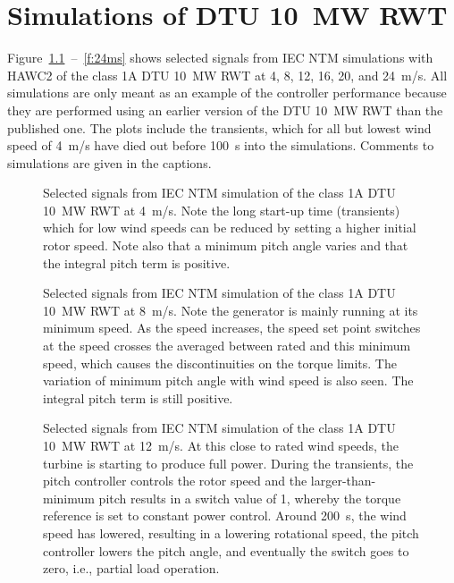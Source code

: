 \chapter{Simulations of DTU 10~MW RWT}

Figure~\ref{f:4ms}~--~\ref{f:24ms} shows selected signals from IEC NTM simulations with HAWC2 of the class 1A DTU 10~MW RWT at 4, 8, 12, 16, 20, and 24~m/s. All simulations are only meant as an example of the controller performance because they are performed using an earlier version of the DTU 10~MW RWT than the published one. The plots include the transients, which for all but lowest wind speed of 4~m/s have died out before 100~s into the simulations. Comments to simulations are given in the captions.


\begin{figure}[t]
\centerline{ }
\caption{Selected signals from IEC NTM simulation of the class 1A DTU 10~MW RWT at 4~m/s. Note the long start-up time (transients) which for low wind speeds can be reduced by setting a higher initial rotor speed. Note also that a minimum pitch angle varies and that the integral pitch term is positive. \label{f:4ms}}
\end{figure}


\begin{figure}[t]
\centerline{ }
\caption{Selected signals from IEC NTM simulation of the class 1A DTU 10~MW RWT at 8~m/s. Note the generator is mainly running at its minimum speed. As the speed increases, the speed set point switches at the speed crosses the averaged between rated and this minimum speed, which causes the discontinuities on the torque limits. The variation of minimum pitch angle with wind speed is also seen. The integral pitch term is still positive. \label{f:8ms}}
\end{figure}


\begin{figure}[t]
\centerline{ }
\caption{Selected signals from IEC NTM simulation of the class 1A DTU 10~MW RWT at 12~m/s. At this close to rated wind speeds, the turbine is starting to produce full power. During the transients, the pitch controller controls the rotor speed and the larger-than-minimum pitch results in a switch value of 1, whereby the torque reference is set to constant power control. Around 200~s, the wind speed has lowered, resulting in a lowering rotational speed, the pitch controller lowers the pitch angle, and eventually the switch goes to zero, i.e., partial load operation. \label{f:12ms}}
\end{figure}


